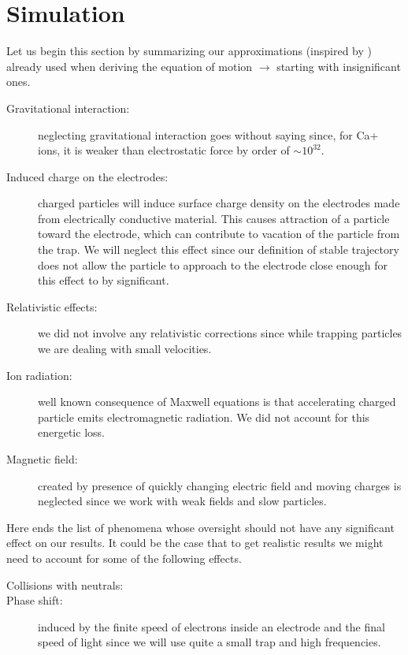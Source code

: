 	
\section{Simulation}
\label{simulation}

Let us begin this section by summarizing our approximations (inspired by \cite{Friedman_1982}) already used when deriving the equation of motion $\rightarrow$ starting with insignificant ones. 

\begin{description}
	\item[Gravitational interaction:] neglecting gravitational interaction goes without saying since, for Ca+ ions, it is weaker than electrostatic force by order of $\sim 10^{32}$.
	\item[Induced charge on the electrodes:] charged particles will induce surface charge density on the electrodes made from electrically conductive material. This causes attraction of a particle toward the electrode, which can contribute to vacation of the particle from the trap. We will neglect this effect since our definition of stable trajectory does not allow the particle to approach to the electrode close enough for this effect to by significant.
	\item[Relativistic effects:] we did not involve any relativistic corrections since while trapping particles we are dealing with small velocities.
	\item[Ion radiation:] well known consequence of Maxwell equations is that accelerating charged particle emits electromagnetic radiation. We did not account for this energetic loss.
	\item[Magnetic field:] created by presence of quickly changing electric field and moving charges is neglected since we work with weak fields and slow particles. 
\end{description}	
Here ends the list of phenomena whose oversight should not have any significant effect on our results. It could be the case that to get realistic results we might need to account for some of the following effects.
\begin{description}
	\item[Collisions with neutrals:]  
	\item[Phase shift:] induced by the finite speed of electrons inside an electrode and the final speed of light since we will use quite a small trap and high frequencies.  
\end{description}

